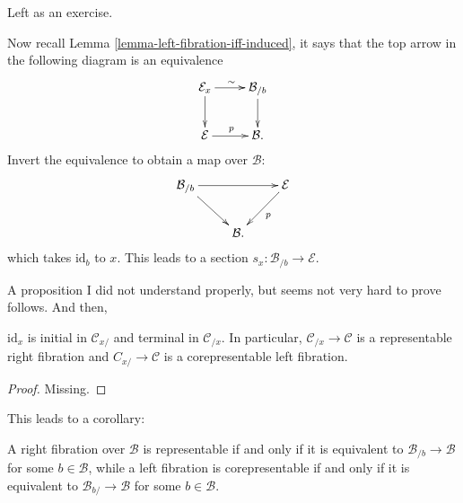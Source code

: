 Left as an exercise.


\medskip\noindent
Now recall Lemma \ref{lemma-left-fibration-iff-induced},
it says that the top arrow in the following diagram
is an equivalence
$$
\xymatrix{
\mathcal{E}_x\ar[r]^\sim\ar[d]&\mathcal{B}_{/b}\ar[d]\\
\mathcal{E}\ar[r]^p&\mathcal{B}.
}
$$
Invert the equivalence to obtain a map over $\mathcal{B}$:
$$
\xymatrix{
\mathcal{B}_{/b} \ar[rd] \ar[rr] && \mathcal{E} \ar[dl]^{p} \\
& \mathcal{B}.
}
$$
which takes $\text{id}_b$ to $x$.
This leads to a section $s_x:\mathcal{B}_{/b}\to \mathcal{E}$.

\medskip\noindent
A proposition I did not understand properly,
but seems not very hard to prove follows. And then,

\begin{proposition}
\label{proposition-maps-over-x-are-representable}
$\text{id}_x$ is initial in $\mathcal{C}_{x/}$ 
and terminal in $\mathcal{C}_{/x}$.
In particular, $\mathcal{C}_{/x}\to \mathcal{C}$ 
is a representable right fibration
and $C_{x/}\to \mathcal{C}$ is a corepresentable left fibration.
\end{proposition} 

\begin{proof}
Missing.
\end{proof}

\noindent
This leads to a corollary:

\begin{lemma}
\label{lemma-fibration-equivalent-iff-is-maps-over-b-fibration}
A right fibration over $\mathcal{B}$ is representable
if and only if it is equivalent to $\mathcal{B}_{/b}\to \mathcal{B}$ 
for some $b \in \mathcal{B}$,
while a left fibration is corepresentable if and only if
it is equivalent to $\mathcal{B}_{b/}\to \mathcal{B}$ 
for some $b \in \mathcal{B}$.
\end{lemma}





